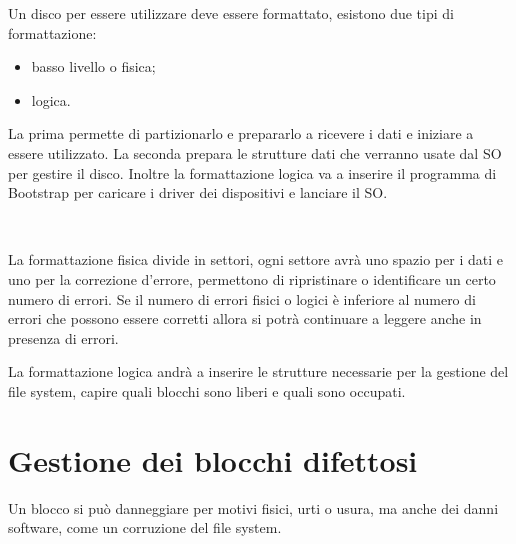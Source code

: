 \documentclass[a4paper, 12pt]{book}
\begin{document}
Un disco per essere utilizzare deve essere formattato, 
esistono due tipi di formattazione:
\begin{itemize}
    \item basso livello o fisica;
    \item logica.
\end{itemize}
La prima permette di partizionarlo e prepararlo a ricevere 
i dati e iniziare a essere utilizzato. La seconda prepara 
le strutture dati che verranno usate dal SO per gestire 
il disco. Inoltre la formattazione logica va a inserire il 
programma di Bootstrap per caricare i driver dei dispositivi 
e lanciare il SO.
\begin{figure}[h!]
    \centering
    \quad
    \\
    \quad
\end{figure}
La formattazione fisica divide in settori, ogni settore 
avrà uno spazio per i dati e uno per la correzione d'errore,
permettono di ripristinare o identificare un certo numero di 
errori. Se il numero di errori fisici o logici è inferiore 
al numero di errori che possono essere corretti allora si 
potrà continuare a leggere anche in presenza di errori.

La formattazione logica andrà a inserire le strutture 
necessarie per la gestione del file system, capire quali 
blocchi sono liberi e quali sono occupati. 

\section{Gestione dei blocchi difettosi}

Un blocco si può danneggiare per motivi fisici, urti o 
usura, ma anche dei danni software, come un corruzione 
del file system. 
\end{document}
